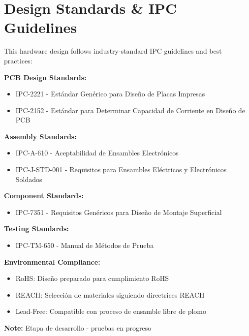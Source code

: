 \documentclass[11pt,a4paper]{article}
\begin{document}

\section*{Design Standards \& IPC Guidelines}

\begin{tcolorbox}[
    colback=blue!5!white,
    colframe=blue!50!black,
    title=IPC Standards Reference,
    fonttitle=\bfseries
]

This hardware design follows industry-standard IPC guidelines and best practices:

\vspace{0.3cm}
\textbf{PCB Design Standards:}
\begin{itemize}
    \item IPC-2221 - Estándar Genérico para Diseño de Placas Impresas
    \item IPC-2152 - Estándar para Determinar Capacidad de Corriente en Diseño de PCB
\end{itemize}

\textbf{Assembly Standards:}
\begin{itemize}
    \item IPC-A-610 - Aceptabilidad de Ensambles Electrónicos
    \item IPC-J-STD-001 - Requisitos para Ensambles Eléctricos y Electrónicos Soldados
\end{itemize}

\textbf{Component Standards:}
\begin{itemize}
    \item IPC-7351 - Requisitos Genéricos para Diseño de Montaje Superficial
\end{itemize}

\textbf{Testing Standards:}
\begin{itemize}
    \item IPC-TM-650 - Manual de Métodos de Prueba
\end{itemize}

\end{tcolorbox}

\vspace{0.5cm}
\begin{tcolorbox}[
    colback=orange!5!white,
    colframe=orange!50!black,
    title=Compliance Status (Development Phase),
    fonttitle=\bfseries
]

\textbf{Environmental Compliance:}
\begin{itemize}
    \item RoHS: Diseño preparado para cumplimiento RoHS
    \item REACH: Selección de materiales siguiendo directrices REACH
    \item Lead-Free: Compatible con proceso de ensamble libre de plomo
\end{itemize}

\textbf{Note:} Etapa de desarrollo - pruebas en progreso

\end{tcolorbox}
\newpage
\end{document}
